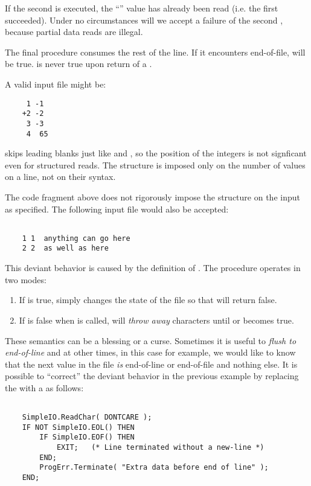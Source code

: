 If the second  is executed, the ``'' value
has already been read (i.e. the first  succeeded).
Under no circumstances will we accept a failure of the second
, because partial data reads are illegal.  

The final procedure  consumes the rest
of the line.  If it encounters end-of-file,  will be
true.   is never true upon return of a .

A valid input file might be:
\begin{verbatim}
     1 -1
    +2 -2
     3 -3
     4  65
\end{verbatim}    
 skips leading blanks just like
 and , so the position of the
integers is not signficant even for
structured reads.  The structure is imposed only on the
number of values on a line, not on their syntax.  

The code fragment above does not rigorously
impose the structure on the input as specified.  
The following input file would also be accepted:

\begin{verbatim}

    1 1  anything can go here
    2 2  as well as here
\end{verbatim}
    
This deviant behavior is caused by the definition of .
The procedure  operates in two modes:
\begin{enumerate}
\item
    If  is true,  simply
    changes the state of the file so that  will
    return false.
\item
    If  is false when  is called, 
     will {\em throw away} characters until
     or  becomes true.
\end{enumerate}

These semantics can be a blessing or a curse.   Sometimes it
is useful to {\em flush to end-of-line} and at other times,
in this case for example, we would like to know that the
next value in the file {\em is} end-of-line or end-of-file
and nothing else.  It is possible to ``correct'' the deviant
behavior in the previous example by replacing the 
with a  as follows:
\begin{verbatim}

    SimpleIO.ReadChar( DONTCARE );
    IF NOT SimpleIO.EOL() THEN
        IF SimpleIO.EOF() THEN
            EXIT;   (* Line terminated without a new-line *)
        END;
        ProgErr.Terminate( "Extra data before end of line" );
    END;
\end{verbatim}

